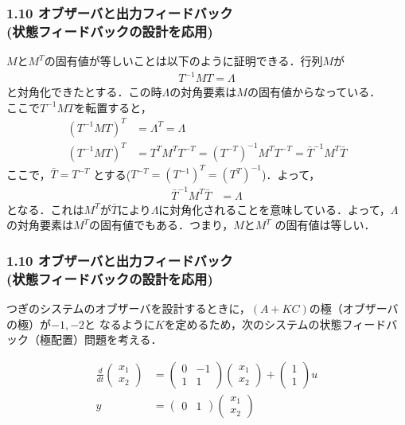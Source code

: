 \documentclass[10pt]{beamer}
\begin{document}
\begin{frame}[t]
\frametitle{1.10 オブザーバと出力フィードバック \\
(状態フィードバックの設計を応用)}
$M$と$M^T$の固有値が等しいことは以下のように証明できる．行列$M$が
\begin{align}
   T^{-1}MT = \Lambda
\end{align}
と対角化できたとする．この時$\Lambda$の対角要素は$M$の固有値からなっている．\\
ここで$T^{-1}MT$を転置すると，
\begin{align}
   (T^{-1}MT)^T &=  \Lambda^T = \Lambda
\\
   (T^{-1}MT)^T &= T^T M^T T^{-T} = (T^{-T})^{-1} M^T T^{-T} = \bar{T}^{-1} M^T \bar{T}
\end{align}
ここで，$\bar{T} = T^{-T}$ とする($T^{-T} = (T^{-1})^T=(T^T)^{-1}$)．よって，
\begin{align}
   \bar{T}^{-1} M^T \bar{T} &=  \Lambda
\end{align}
となる．これは$M^{T}$が$\bar{T}$により$\Lambda$に対角化されることを意味している．よって，$\Lambda$の対角要素は$M^{T}$の固有値でもある．つまり，$M$と$M^{T}$
の固有値は等しい．
\end{frame}


\begin{frame}[t]
\frametitle{1.10 オブザーバと出力フィードバック \\
(状態フィードバックの設計を応用)}
つぎのシステムのオブザーバを設計するときに，$(A+KC)$の極（オブザーバの極）が$-1,-2$と
なるように$K$を定めるため，次のシステムの状態フィードバック（極配置）問題を考える．

\begin{align}
 \frac{d}{dt}
 \left(
 \begin{array}{c}
  x_1 \\
  x_2
 \end{array}
 \right)
 &=
 \left(
 \begin{array}{cc}
  0 & -1 \\
  1 & 1
 \end{array}
 \right)
 \left(
 \begin{array}{c}
  x_1 \\
  x_2
 \end{array}
 \right) +
 \left(
 \begin{array}{c}
  1 \\
  1
 \end{array}
 \right) u \\
 y &=
 \left(
 \begin{array}{cc}
  0 & 1
 \end{array}
 \right)
 \left(
 \begin{array}{c}
  x_1 \\
  x_2
 \end{array}
 \right)
\end{align}
\end{frame}
\end{document}
